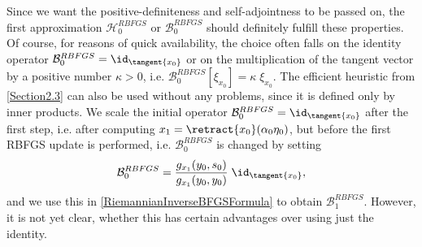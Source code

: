 Since we want the positive-definiteness and self-adjointness to be passed on, the first approximation $\mathcal{H}^{RBFGS}_0$ or $\mathcal{B}^{RBFGS}_0$ should definitely fulfill these properties. Of course, for reasons of quick availability, the choice often falls on the identity operator $\mathcal{B}^{RBFGS}_0 = \id_{\tangent{x_0}}$ or on the multiplication of the tangent vector by a positive number $\kappa > 0$, i.e. $\mathcal{B}^{RBFGS}_0 [\xi_{x_0}] = \kappa \; \xi_{x_0}$. The efficient heuristic from \cref{Section2.3} can also be used without any problems, since it is defined only by inner products. We scale the initial operator $\mathcal{B}^{RBFGS}_0 = \id_{\tangent{x_0}}$ after the first step, i.e. after computing $x_{1} = \retract{x_0}(\alpha_0 \eta_0)$, but before the first RBFGS update is performed, i.e. $\mathcal{B}^{RBFGS}_0$ is changed by setting
\begin{equation*}
    \mathcal{B}^{RBFGS}_0 = \frac{g_{x_1}(y_0, s_0)}{g_{x_1}(y_0, y_0)} \; \id_{\tangent{x_0}},
\end{equation*}
and we use this in \cref{RiemannianInverseBFGSFormula} to obtain $\mathcal{B}^{RBFGS}_1$. However, it is not yet clear, whether this has certain advantages over using just the identity. 


